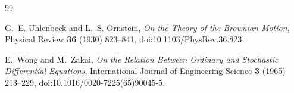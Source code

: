 \documentclass[11pt]{article}
\begin{document}
\begin{thebibliography}{99}

G.~E. Uhlenbeck and L.~S. Ornstein,
\emph{On the Theory of the Brownian Motion},
Physical Review \textbf{36} (1930) 823--841,
doi:10.1103/PhysRev.36.823.

E.~Wong and M.~Zakai,
\emph{On the Relation Between Ordinary and Stochastic Differential
Equations},
International Journal of Engineering Science \textbf{3} (1965) 213--229,
doi:10.1016/0020-7225(65)90045-5.

\end{thebibliography}
\end{document}
